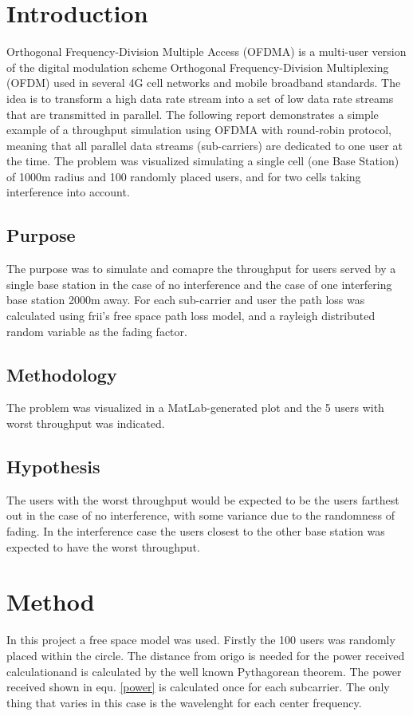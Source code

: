 \documentclass[twocolumn]{article}
\begin{document}
\section{Introduction}
Orthogonal Frequency-Division Multiple Access (OFDMA) is a multi-user version of the digital modulation scheme Orthogonal Frequency-Division Multiplexing (OFDM) used in several 4G cell networks and mobile broadband standards. The idea is to transform a high data rate stream into a set of low data rate streams that are transmitted in parallel. The following report demonstrates a simple example of a throughput simulation using OFDMA with round-robin protocol,%
 meaning that all parallel data streams (sub-carriers) are dedicated to one user at the time. The problem was visualized simulating a single cell (one Base Station) of 1000m radius and 100 randomly placed users, and for two cells taking interference into account.



\subsection{Purpose}
The purpose was to simulate and comapre the throughput for users served by a single base station in the case of no interference and the case of one interfering base station 2000m away. For each sub-carrier and user the path loss was calculated using frii's free space path loss model, and a rayleigh distributed random variable as the fading factor.


\subsection{Methodology}
The problem was visualized in a MatLab-generated plot and the 5 users with worst throughput was indicated.

\subsection{Hypothesis}
The users with the worst throughput would be expected to be the users farthest out in the case of no interference, with some variance due to the randomness of fading. In the interference case the users closest to the other base station was expected to have the worst throughput.
\section{Method}
In this project a free space model was used.
Firstly the 100 users was randomly placed within the circle. The distance from origo is needed for the power received calculationand is calculated by the well known Pythagorean theorem. The power received shown in equ. \eqref{power}  is calculated once for each subcarrier. The only thing that varies in this case is the wavelenght for each center frequency.
\end{document}

